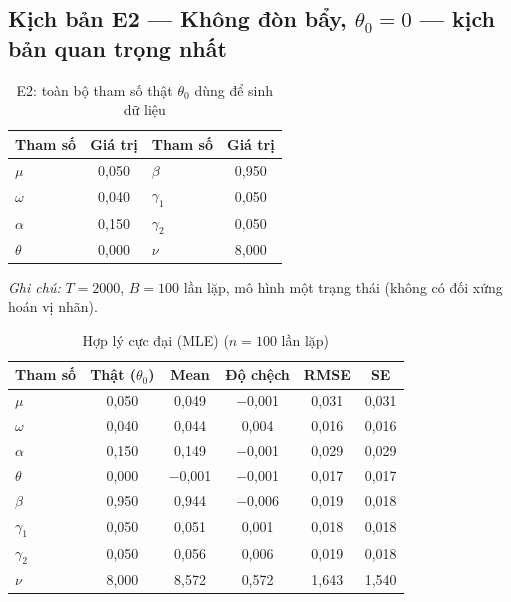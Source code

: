 \documentclass[11pt,a4paper]{article}
\begin{document}
\bigskip

\subsection*{Kịch bản E2 --- Không đòn bẩy, $\theta_0=0$ --- kịch bản quan trọng nhất}
\begin{table}[H]\centering\small
\caption{E2: toàn bộ tham số thật $\theta_0$ dùng để sinh dữ liệu}
\begin{tabularx}{\textwidth}{l C  l C}
\toprule
\textbf{Tham số} & \textbf{Giá trị} & \textbf{Tham số} & \textbf{Giá trị} \\
\midrule
$\mu$ & 0,050 & $\beta$ & 0,950 \\
$\omega$ & 0,040 & $\gamma_1$ & 0,050 \\
$\alpha$ & 0,150 & $\gamma_2$ & 0,050 \\
$\theta$ & 0,000 & $\nu$ & 8,000 \\
\bottomrule
\end{tabularx}
\vspace{0.2em}\raggedright\scriptsize \emph{Ghi chú:} $T=2000$, $B=100$ lần lặp, mô hình một trạng thái (không có đối xứng hoán vị nhãn).
\end{table}

\begin{table}[H]\centering\scriptsize
\caption{Hợp lý cực đại (MLE) ($n=100$ lần lặp)}
\begin{tabularx}{\textwidth}{l C C C C C}
\toprule
\textbf{Tham số} & \textbf{Thật ($\theta_0$)} & \textbf{Mean} & \textbf{Độ chệch} & \textbf{RMSE} & \textbf{SE} \\
\midrule
$\mu$ & 0,050 & 0,049 & $-$0,001 & 0,031 & 0,031 \\
$\omega$ & 0,040 & 0,044 & 0,004 & 0,016 & 0,016 \\
$\alpha$ & 0,150 & 0,149 & $-$0,001 & 0,029 & 0,029 \\
$\theta$ & 0,000 & $-$0,001 & $-$0,001 & 0,017 & 0,017 \\
$\beta$ & 0,950 & 0,944 & $-$0,006 & 0,019 & 0,018 \\
$\gamma_1$ & 0,050 & 0,051 & 0,001 & 0,018 & 0,018 \\
$\gamma_2$ & 0,050 & 0,056 & 0,006 & 0,019 & 0,018 \\
$\nu$ & 8,000 & 8,572 & 0,572 & 1,643 & 1,540 \\
\bottomrule
\end{tabularx}
\end{table}
\end{document}
